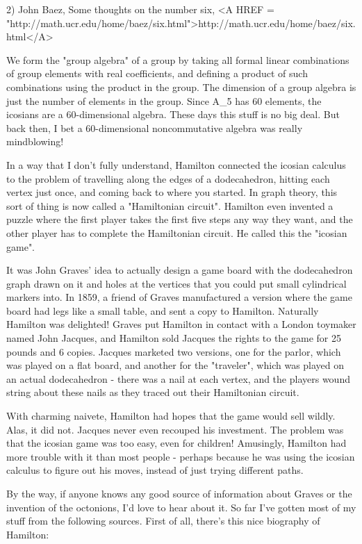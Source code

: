 2) John Baez, Some thoughts on the number six, 
<A HREF = "http://math.ucr.edu/home/baez/six.html">http://math.ucr.edu/home/baez/six.html</A> 

We form the "group algebra" of a group by taking all formal linear 
combinations of group elements with real coefficients, and defining 
a product of such combinations using the product in the group.  The 
dimension of a group algebra is just the number of elements in the 
group.  Since A_{5} has 60 elements, the icosians are a 60-dimensional 
algebra.  These days this stuff is no big deal.  But back then, I bet
a 60-dimensional noncommutative algebra was really mindblowing!

In a way that I don't fully understand, Hamilton connected the icosian
calculus to the problem of travelling along the edges of a dodecahedron,
hitting each vertex just once, and coming back to where you started.  In
graph theory, this sort of thing is now called a "Hamiltonian
circuit".  Hamilton even invented a puzzle where the first player
takes the first five steps any way they want, and the other player has
to complete the Hamiltonian circuit.  He called this the "icosian
game".

It was John Graves' idea to actually design a game board with the 
dodecahedron graph drawn on it and holes at the vertices that you
could put small cylindrical markers into.   In 1859, a friend of Graves 
manufactured a version where the game board had legs like a small table,
and sent a copy to Hamilton.  Naturally Hamilton was delighted!  Graves
put Hamilton in contact with a London toymaker named John Jacques, and
Hamilton sold Jacques the rights to the game for 25 pounds and 6 copies.
Jacques marketed two versions, one for the parlor, which was played on
a flat board, and another for the "traveler", which was played on an
actual dodecahedron - there was a nail at each vertex, and the players
wound string about these nails as they traced out their Hamiltonian 
circuit.  

With charming naivete, Hamilton had hopes that the game would sell wildly.
Alas, it did not.  Jacques never even recouped his investment.  The problem 
was that the icosian game was too easy, even for children!  Amusingly, 
Hamilton had more trouble with it than most people - perhaps because he 
was using the icosian calculus to figure out his moves, instead of just 
trying different paths.  

By the way, if anyone knows any good source of information about 
Graves or the invention of the octonions, I'd love to hear about it.  
So far I've gotten most of my stuff from the following sources.  
First of all, there's this nice biography of Hamilton:

